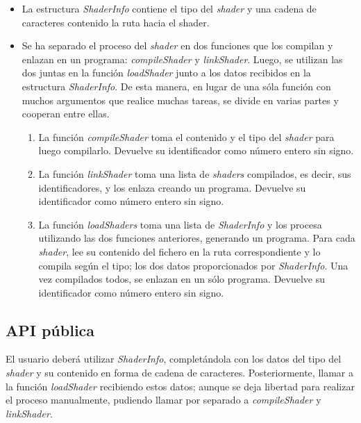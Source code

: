 \begin{itemize}

    \item La estructura \textit{ShaderInfo} contiene el tipo del \textit{shader} y una cadena de caracteres contenido la ruta hacia el shader.
    
    \item Se ha separado el proceso del \textit{shader} en dos funciones que los compilan y enlazan en un programa: \textit{compileShader} y \textit{linkShader}. Luego, se utilizan las dos juntas en la función \textit{loadShader} junto a los datos recibidos en la estructura \textit{ShaderInfo}. De esta manera, en lugar de una sóla función con muchos argumentos que realice muchas tareas, se divide en varias partes y cooperan entre ellas.
    \begin{enumerate}
        \item La función \textit{compileShader} toma el contenido y el tipo del \textit{shader} para luego compilarlo. Devuelve su identificador como número entero sin signo.

        \item La función \textit{linkShader} toma una lista de \textit{shaders} compilados, es decir, sus identificadores, y los enlaza creando un programa. Devuelve su identificador como número entero sin signo.

        \item La función \textit{loadShaders} toma una lista de \textit{ShaderInfo} y los procesa utilizando las dos funciones anteriores, generando un programa. Para cada \textit{shader}, lee su contenido del fichero en la ruta correspondiente y lo compila según el tipo; los dos datos proporcionados por \textit{ShaderInfo}. Una vez compilados todos, se enlazan en un sólo programa. Devuelve su identificador como número entero sin signo.
        
    \end{enumerate}
    
\end{itemize}

\subsection{API pública}
El usuario deberá utilizar \textit{ShaderInfo}, completándola con los datos del tipo del \textit{shader} y su contenido en forma de cadena de caracteres. Posteriormente, llamar a la función \textit{loadShader} recibiendo estos datos; aunque se deja libertad para realizar el proceso manualmente, pudiendo llamar por separado a \textit{compileShader} y \textit{linkShader}.

